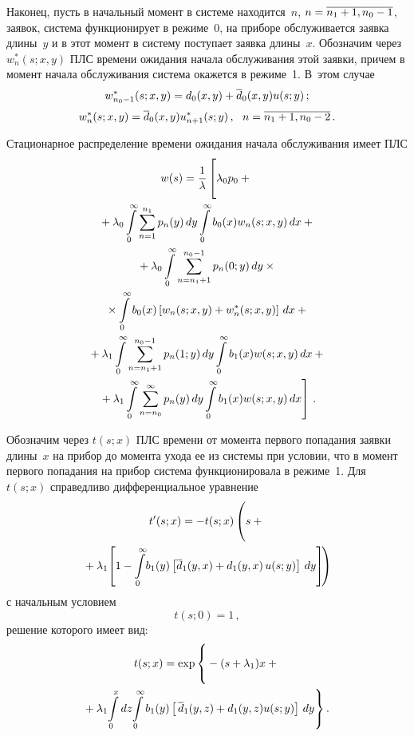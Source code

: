 \begin{multicols}{2}
Наконец, пусть в начальный момент в системе находится~$n$, 
$n\hm=\overline{n_1+1,n_0-1}$, заявок, система
функционирует в режиме~0, на приборе обслуживается
заявка длины~$y$ и в этот момент в систему поступает
заявка длины~$x$.
Обозначим через $w^*_n(s;x,y)$ ПЛС времени ожидания
начала обслуживания этой заявки, причем в момент
начала обслуживания сис\-те\-ма окажется в режиме~1.
В~этом случае
\begin{equation}
\label{5-3-3-m}
w^*_{n_0-1}(s;x,y) = d_0(x,y) + \overline d_0(x,y) u(s;y)\,;
\end{equation}
$$
w^*_n(s;x,y) = \overline d_0(x,y) u^*_{n+1}(s;y)\,,\ \ n=\overline{n_1+1,n_0-2} \,.
$$


Стационарное распределение времени ожидания начала
обслуживания имеет ПЛС
\begin{multline*}
w(s) = \displaystyle\frac{\displaystyle 1\mathstrut}{\displaystyle  \lambda\mathstrut} \left[ \vphantom{\int\limits_0^\infty}
\lambda_0 p_0+{}\right.\\
{}+ \lambda_0 \int\limits_0^\infty \sum\limits_{n=1}^{n_1}
p_n(y) \, dy \int\limits_0^\infty b_0(x) w_n(s;x,y) \, dx
+{}
\\
{}+
\lambda_0 \int\limits_0^\infty \sum\limits_{n=n_1+1}^{n_0-1} p_n(0;y)\, dy\times{}\\
{}\times
\int\limits_0^\infty b_0(x) \left[w_n(s;x,y) + w^*_n(s;x,y)\right]\, dx
+{}
\\
{}+
\lambda_1 \int\limits_0^\infty \sum\limits_{n=n_1+1}^{n_0-1} p_n(1;y) \, dy
\int\limits_0^\infty b_1(x) w(s;x,y) \, dx
+{}\\
\left.{}+
\lambda_1 \int\limits_0^\infty \sum\limits_{n=n_0}^{\infty} p_n(y) \, dy
\int\limits_0^\infty b_1(x) w(s;x,y) \, dx
\right]\,.
\end{multline*}

Обозначим через $t(s;x)$ ПЛС времени от момента
первого попадания заявки длины~$x$
на прибор до момента ухода ее из системы при условии,
что в момент первого попадания на прибор система
функционировала в режиме~1.
Для $t(s;x)$ справедливо дифференциальное уравнение
\begin{multline*}
t'(s;x)= - t(s;x) \left( \vphantom{\int\limits_0^\infty}
s + {}\right.\\
\!\!\left.{}+\lambda_1 \!\left[
1 - \int\limits_0^\infty\! b_1(y)\left[\d_1(y,x) +
d_1(y,x)\, u(s;y)\vphantom{\overline{d}}\right] \, dy
\right]\!
\right)\hspace*{-1.717pt}
\end{multline*}
с начальным условием
$$
t(s;0)= 1 \,,
$$
решение которого имеет вид:
\begin{multline*}
t(s;x) = \exp\left\{ \vphantom{\int\limits_0^\infty}
-(s + \lambda_1) x +{}\right.\\
\!\!\left.{}+ \lambda_1 \!\int\limits_0^x\,\! dz\!
\int\limits_0^\infty b_1(y) \left[\,\overline d_1(y,z) +  d_1(y,z) u(s;y)\right] \, dy
\right\}.
\end{multline*}


\end{multicols}
